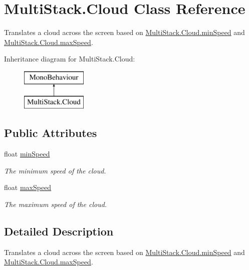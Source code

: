 \hypertarget{class_multi_stack_1_1_cloud}{}\section{Multi\+Stack.\+Cloud Class Reference}
\label{class_multi_stack_1_1_cloud}


Translates a cloud across the screen based on \hyperlink{class_multi_stack_1_1_cloud_a41c5aba0ae109496d637a7e08c726171}{Multi\+Stack.\+Cloud.\+min\+Speed} and \hyperlink{class_multi_stack_1_1_cloud_ad665595ffaaa5c7b5c6d5a7222d40c89}{Multi\+Stack.\+Cloud.\+max\+Speed}.  


Inheritance diagram for Multi\+Stack.\+Cloud\+:\begin{figure}[H]
\begin{center}
\leavevmode
\includegraphics[height=2.000000cm]{class_multi_stack_1_1_cloud}
\end{center}
\end{figure}
\subsection*{Public Attributes}
\begin{DoxyCompactItemize}
\item 
float \hyperlink{class_multi_stack_1_1_cloud_a41c5aba0ae109496d637a7e08c726171}{min\+Speed}
\begin{DoxyCompactList}\small\item\em The minimum speed of the cloud. \end{DoxyCompactList}\item 
float \hyperlink{class_multi_stack_1_1_cloud_ad665595ffaaa5c7b5c6d5a7222d40c89}{max\+Speed}
\begin{DoxyCompactList}\small\item\em The maximum speed of the cloud. \end{DoxyCompactList}\end{DoxyCompactItemize}


\subsection{Detailed Description}
Translates a cloud across the screen based on \hyperlink{class_multi_stack_1_1_cloud_a41c5aba0ae109496d637a7e08c726171}{Multi\+Stack.\+Cloud.\+min\+Speed} and \hyperlink{class_multi_stack_1_1_cloud_ad665595ffaaa5c7b5c6d5a7222d40c89}{Multi\+Stack.\+Cloud.\+max\+Speed}. 



